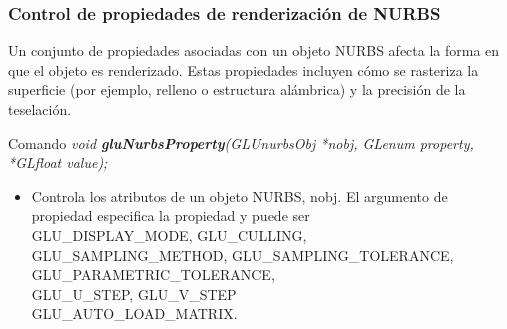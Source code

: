 \documentclass[10.5pt]{beamer}
\begin{document}

\begin{frame}[fragile]
\frametitle{Control de propiedades de renderización de NURBS}
\small

Un conjunto de propiedades asociadas con un objeto NURBS afecta la
forma en que el objeto es renderizado. Estas propiedades incluyen
cómo se rasteriza la superficie (por ejemplo, relleno o estructura alámbrica)
y la precisión de la teselación.

\begin{alertblock}{Comando}
    \small
    \emph{void \textbf{gluNurbsProperty}(GLUnurbsObj *nobj, GLenum property,\\*GLfloat value);}
\end{alertblock}

\begin{itemize}
    \justifying
    \item Controla los atributos de un objeto NURBS, nobj.
    El argumento de propiedad especifica la propiedad y puede
    ser \\ GLU\_DISPLAY\_MODE, GLU\_CULLING,\\GLU\_SAMPLING\_METHOD,
    GLU\_SAMPLING\_TOLERANCE,\\GLU\_PARAMETRIC\_TOLERANCE,\\GLU\_U\_STEP,
    GLU\_V\_STEP\\ GLU\_AUTO\_LOAD\_MATRIX.
\end{itemize}

\end{frame}

\end{document}
